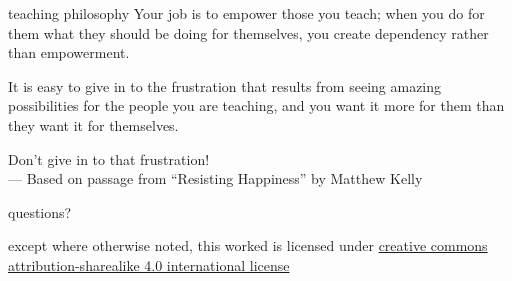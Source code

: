 \documentclass[10pt,t,usenames,dvipsnames]{beamer}
\begin{document}
  \begin{frame}{teaching philosophy}
    Your job is to empower those you teach; when you do for them what they
    should be doing for themselves, you create dependency rather than
    empowerment.

    It is easy to give in to the frustration that results from seeing amazing
    possibilities for the people you are teaching, and you want it more for them
    than they want it for themselves. 

    Don’t give in to that frustration! \\
    \hfill \footnotesize{--- Based on passage from ``Resisting Happiness'' by
      Matthew Kelly}

  \end{frame}

  \begin{frame}[standout]
    \ifnotes
    \fi
    questions?
  \end{frame}

  \appendix

  \begin{frame}[c]
    \begin{center}\ccbysa\end{center}

    except where otherwise noted, this worked is licensed under
    \href{http://creativecommons.org/licenses/by-sa/4.0/}{creative commons
    attribution-sharealike 4.0 international license}
  \end{frame}
\end{document}
